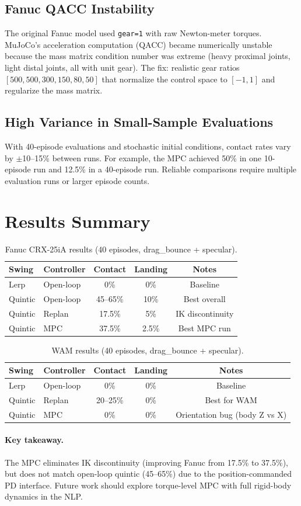 \documentclass[11pt,letterpaper]{article}
\begin{document}
\subsection{Fanuc QACC Instability}

The original Fanuc model used \texttt{gear=1} with raw Newton-meter torques.  MuJoCo's acceleration computation (QACC) became numerically unstable because the mass matrix condition number was extreme (heavy proximal joints, light distal joints, all with unit gear).  The fix: realistic gear ratios $[500, 500, 300, 150, 80, 50]$ that normalize the control space to $[-1, 1]$ and regularize the mass matrix.

\subsection{High Variance in Small-Sample Evaluations}

With 40-episode evaluations and stochastic initial conditions, contact rates vary by $\pm$10--15\% between runs.  For example, the MPC achieved 50\% in one 10-episode run and 12.5\% in a 40-episode run.  Reliable comparisons require multiple evaluation runs or larger episode counts.

\section{Results Summary}
\label{sec:results}

\begin{table}[H]
\centering\small
\caption{Fanuc CRX-25iA results (40 episodes, drag\_bounce + specular).}
\begin{tabular}{@{}llccc@{}}
\toprule
Swing & Controller & Contact & Landing & Notes \\
\midrule
Lerp & Open-loop & 0\% & 0\% & Baseline \\
Quintic & Open-loop & 45--65\% & 10\% & Best overall \\
Quintic & Replan & 17.5\% & 5\% & IK discontinuity \\
Quintic & MPC & 37.5\% & 2.5\% & Best MPC run \\
\bottomrule
\end{tabular}
\end{table}

\begin{table}[H]
\centering\small
\caption{WAM results (40 episodes, drag\_bounce + specular).}
\begin{tabular}{@{}llccc@{}}
\toprule
Swing & Controller & Contact & Landing & Notes \\
\midrule
Lerp & Open-loop & 0\% & 0\% & Baseline \\
Quintic & Replan & 20--25\% & 0\% & Best for WAM \\
Quintic & MPC & 0\% & 0\% & Orientation bug (body Z vs X) \\
\bottomrule
\end{tabular}
\end{table}

\paragraph{Key takeaway.}  The MPC eliminates IK discontinuity (improving Fanuc from 17.5\% to 37.5\%), but does not match open-loop quintic (45--65\%) due to the position-commanded PD interface.  Future work should explore torque-level MPC with full rigid-body dynamics in the NLP.
\end{document}
